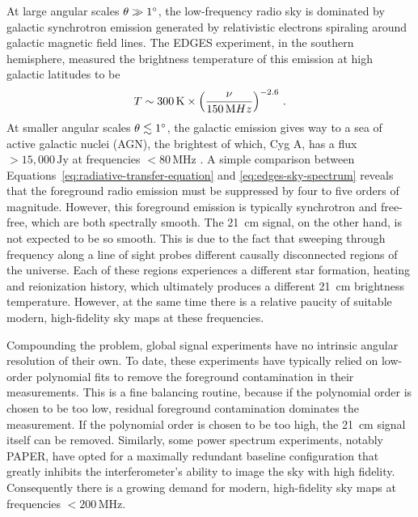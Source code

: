 \begin{bibunit}
At large angular scales $\theta \gg 1\arcdeg$, the low-frequency radio sky is dominated by galactic
synchrotron emission generated by relativistic electrons spiraling around galactic magnetic field
lines. The EDGES experiment, in the southern hemisphere, measured the brightness temperature of this
emission at high galactic latitudes to be \citep{2017MNRAS.464.4995M}
\begin{equation}\label{eq:edges-sky-spectrum}
    T \sim 300\,{\rm K} \times \left(\frac{\nu}{150\,{\rm MHz}}\right)^{-2.6}\,.
\end{equation}
At smaller angular scales $\theta \lesssim 1\arcdeg$, the galactic emission gives way to a sea of
active galactic nuclei (AGN), the brightest of which, Cyg A, has a flux $>15,000\,\text{Jy}$ at
frequencies $<80\,\text{MHz}$ \citep{1977A&A....61...99B}. A simple comparison between
Equations~\ref{eq:radiative-transfer-equation} and \ref{eq:edges-sky-spectrum} reveals that the
foreground radio emission must be suppressed by four to five orders of magnitude.  However, this
foreground emission is typically synchrotron and free-free, which are both spectrally smooth. The
21~cm signal, on the other hand, is not expected to be so smooth. This is due to the fact that
sweeping through frequency along a line of sight probes different causally disconnected regions of
the universe. Each of these regions experiences a different star formation, heating and reionization
history, which ultimately produces a different 21~cm brightness temperature.  However, at the same
time there is a relative paucity of suitable modern, high-fidelity sky maps at these frequencies.

Compounding the problem, global signal experiments have no intrinsic angular resolution of their
own. To date, these experiments have typically relied on low-order polynomial fits to remove the
foreground contamination in their measurements. This is a fine balancing routine, because if the
polynomial order is chosen to be too low, residual foreground contamination dominates the
measurement. If the polynomial order is chosen to be too high, the 21~cm signal itself can be
removed. Similarly, some power spectrum experiments, notably PAPER, have opted for a maximally
redundant baseline configuration that greatly inhibits the interferometer's ability to image the sky
with high fidelity. Consequently there is a growing demand for modern, high-fidelity sky maps at
frequencies $<200\,\text{MHz}$.


\end{bibunit}
